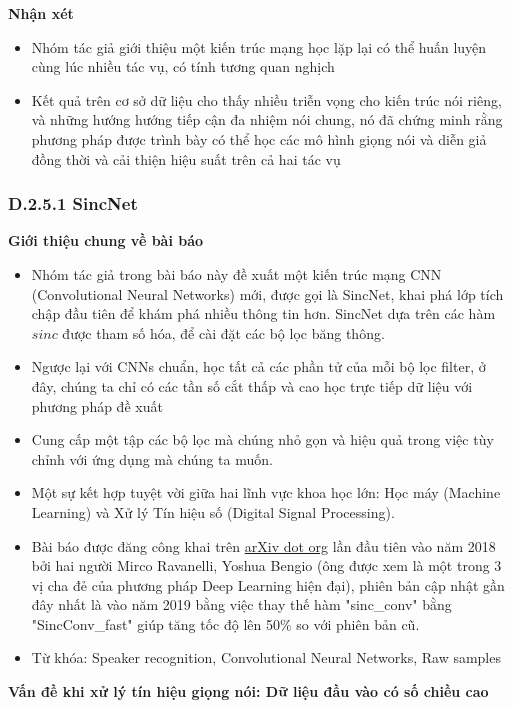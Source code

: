\documentclass{article}
\begin{document}
	\textbf{Nhận xét}
	\begin{itemize}
		\item Nhóm tác giả giới thiệu một kiến trúc mạng học lặp lại có thể huấn luyện cùng lúc nhiều tác vụ, có tính tương quan nghịch
		\item Kết quả trên cơ sở dữ liệu cho thấy nhiều triễn vọng cho kiến trúc nói riêng, và những hướng hướng tiếp cận đa nhiệm nói chung, nó đã chứng minh rằng phương pháp được trình bày có thể học các mô hình giọng nói và diễn giả đồng thời và cải thiện hiệu suất trên cả hai tác vụ
	\end{itemize}
	\subsubsection{D.2.5.1 SincNet}
	\qquad \textbf{Giới thiệu chung về bài báo}
	\begin{itemize}
		\item Nhóm tác giả trong bài báo này đề xuất một kiến trúc mạng CNN (Convolutional Neural Networks) mới, được gọi là SincNet, khai phá lớp tích chập đầu tiên để khám phá nhiều thông tin hơn. SincNet dựa trên các hàm $sinc$ được tham số hóa, để cài đặt các bộ lọc băng thông.
		\item Ngược lại với CNNs chuẩn, học tất cả các phần tử của mỗi bộ lọc filter, ở đây, chúng ta chỉ có các tần số cắt thấp và cao học trực tiếp dữ liệu với phương pháp đề xuất
		\item Cung cấp một tập các bộ lọc mà chúng nhỏ gọn và hiệu quả trong việc tùy chỉnh với ứng dụng mà chúng ta muốn.
		\item Một sự kết hợp tuyệt vời giữa hai lĩnh vực khoa học lớn: Học máy (Machine Learning) và Xử lý Tín hiệu số (Digital Signal Processing).
		\item Bài báo được đăng công khai trên \href{arxiv.org}{arXiv dot org} lần đầu tiên vào năm 2018 bởi hai người Mirco Ravanelli, Yoshua Bengio (ông được xem là một trong 3 vị cha đẻ của phương pháp Deep Learning hiện đại), phiên bản cập nhật gần đây nhất là vào năm 2019 bằng việc thay thế hàm "sinc\_conv" bằng "SincConv\_fast" giúp tăng tốc độ lên 50\% so với phiên bản cũ.
		\item Từ khóa: Speaker recognition, Convolutional Neural Networks, Raw samples
	\end{itemize}
	 
	\textbf{Vấn đề khi xử lý tín hiệu giọng nói: Dữ liệu đầu vào có số chiều cao}
	
\end{document}
